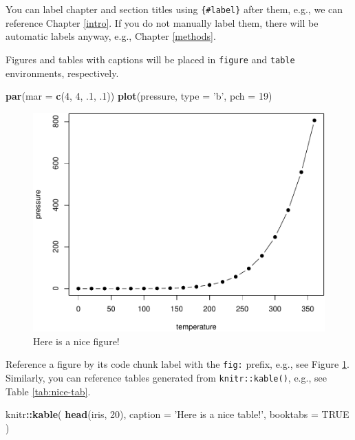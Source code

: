 \documentclass[]{book}
\newenvironment{Shaded}{\begin{snugshade}}{\end{snugshade}}
\newcommand{\KeywordTok}[1]{\textcolor[rgb]{0.13,0.29,0.53}{\textbf{#1}}}
\newcommand{\DataTypeTok}[1]{\textcolor[rgb]{0.13,0.29,0.53}{#1}}
\newcommand{\DecValTok}[1]{\textcolor[rgb]{0.00,0.00,0.81}{#1}}
\newcommand{\StringTok}[1]{\textcolor[rgb]{0.31,0.60,0.02}{#1}}
\newcommand{\OtherTok}[1]{\textcolor[rgb]{0.56,0.35,0.01}{#1}}
\newcommand{\OperatorTok}[1]{\textcolor[rgb]{0.81,0.36,0.00}{\textbf{#1}}}
\newcommand{\NormalTok}[1]{#1}
\begin{document}
You can label chapter and section titles using \texttt{\{\#label\}}
after them, e.g., we can reference Chapter \ref{intro}. If you do not
manually label them, there will be automatic labels anyway, e.g.,
Chapter \ref{methods}.

Figures and tables with captions will be placed in \texttt{figure} and
\texttt{table} environments, respectively.

\begin{Shaded}
\begin{Highlighting}[]
\KeywordTok{par}\NormalTok{(}\DataTypeTok{mar =} \KeywordTok{c}\NormalTok{(}\DecValTok{4}\NormalTok{, }\DecValTok{4}\NormalTok{, .}\DecValTok{1}\NormalTok{, .}\DecValTok{1}\NormalTok{))}
\KeywordTok{plot}\NormalTok{(pressure, }\DataTypeTok{type =} \StringTok{'b'}\NormalTok{, }\DataTypeTok{pch =} \DecValTok{19}\NormalTok{)}
\end{Highlighting}
\end{Shaded}

\begin{figure}

{\centering \includegraphics[width=0.8\linewidth]{bookdown-demo_files/figure-latex/nice-fig-1} 

}

\caption{Here is a nice figure!}\label{fig:nice-fig}
\end{figure}

Reference a figure by its code chunk label with the \texttt{fig:}
prefix, e.g., see Figure \ref{fig:nice-fig}. Similarly, you can
reference tables generated from \texttt{knitr::kable()}, e.g., see Table
\ref{tab:nice-tab}.

\begin{Shaded}
\begin{Highlighting}[]
\NormalTok{knitr}\OperatorTok{::}\KeywordTok{kable}\NormalTok{(}
  \KeywordTok{head}\NormalTok{(iris, }\DecValTok{20}\NormalTok{), }\DataTypeTok{caption =} \StringTok{'Here is a nice table!'}\NormalTok{,}
  \DataTypeTok{booktabs =} \OtherTok{TRUE}
\NormalTok{)}
\end{Highlighting}
\end{Shaded}
\end{document}
